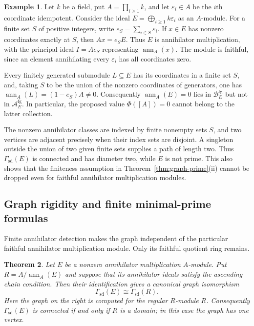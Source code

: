 \documentclass[11pt]{amsart}
\theoremstyle{plain}
\newtheorem{theorem}{Theorem}[section]
\theoremstyle{definition}
\newtheorem{example}[theorem]{Example}
\theoremstyle{remark}
\newcommand{\ann}{\operatorname{ann}}
\newcommand{\GammaSD}{\Gamma_{\mathrm{sd}}}
\numberwithin{equation}{section}
\begin{document}
\begin{example}\label{ex:semilattice-gap}
Let $k$ be a field, put $A=\prod_{i\geq1}k$, and let $\varepsilon_i\in A$
be the $i$th coordinate idempotent. Consider the ideal
$E=\bigoplus_{i\geq1}k\varepsilon_i$ as an $A$-module.
For a finite set $S$ of positive integers, write
$e_S=\sum_{i\in S}\varepsilon_i$.
If $x\in E$ has nonzero coordinates exactly at $S$, then
$Ax=e_SE$. Thus $E$ is annihilator multiplication, with the principal ideal
$I=Ae_S$ representing $\ann_A(x)$.
The module is faithful, since an element annihilating every
$\varepsilon_i$ has all coordinates zero.

Every finitely generated submodule $L\subseteq E$ has its coordinates in a
finite set $S$, and, taking $S$ to be the union of the nonzero coordinates
of generators, one has
$\ann_A(L)=(1-e_S)A\ne0$.
Consequently $\ann_A(E)=0$ lies in $\mathcal B_E^{\mathrm{fg}}$ but not
in $\mathcal A_E^{\mathrm{fg}}$.
In particular, the proposed value $\Phi([A])=0$ cannot belong to the latter
collection.

The nonzero annihilator classes are indexed by finite nonempty sets $S$,
and two vertices are adjacent precisely when their index sets are disjoint.
A singleton outside the union of two given finite sets supplies a path of
length two. Thus $\GammaSD(E)$ is connected and has diameter two, while
$E$ is not prime. This also shows that the finiteness assumption in
Theorem~\ref{thm:graph-prime}(ii) cannot be dropped even for faithful
annihilator multiplication modules.
\end{example}

\subsection{Graph rigidity and finite minimal-prime formulas}

Finite annihilator detection makes the graph independent of the particular
faithful annihilator multiplication module. Only its faithful quotient
ring remains.

\begin{theorem}\label{thm:graph-rigidity}
Let $E$ be a nonzero annihilator multiplication $A$-module.
Put $R=A/\ann_A(E)$ and suppose that its annihilator ideals satisfy
the ascending chain condition. Then their identification gives a
canonical graph isomorphism
\[
 \GammaSD(E)\cong\GammaSD(R).
\]
Here the graph on the right is computed for the regular $R$-module $R$.
Consequently $\GammaSD(E)$ is connected if and only if $R$ is a domain;
in this case the graph has one vertex.
\end{theorem}
\end{document}
